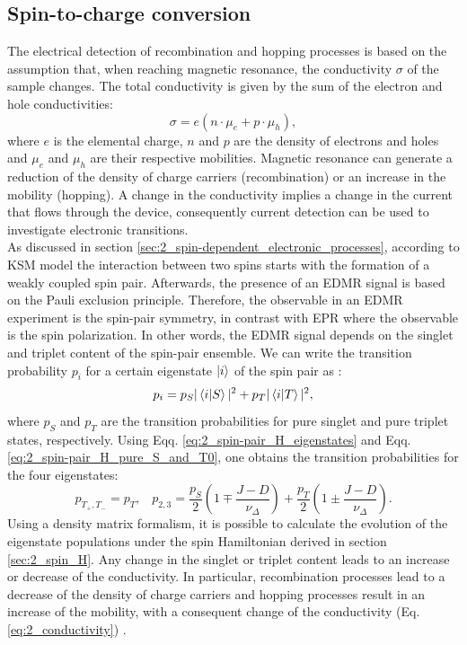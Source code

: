 \documentclass[a4paper]{book}
\newcommand{\sss}{\;\;\;} %
\begin{document}
	\subsection{Spin-to-charge conversion}
	\label{sec:2_spin-charge_conversion}
	The electrical detection of recombination and hopping processes is based on the assumption that, when reaching magnetic resonance, the conductivity $\sigma$ of the sample changes. The total conductivity is given by the sum of the electron and hole conductivities:
	\begin{equation}
		\sigma = e(n\cdot \mu_e + p\cdot \mu_h),
		\label{eq:2_conductivity}
	\end{equation}
	where $e$ is the elemental charge, $n$ and $p$ are the density of electrons and holes and $\mu_e$ and $\mu_h$ are their respective mobilities. Magnetic resonance can generate a reduction of the density of charge carriers (recombination) or an increase in the mobility (hopping). A change in the conductivity implies a change in the current that flows through the device, consequently current detection can be used to investigate electronic transitions.\\
	As discussed in section \ref{sec:2_spin-dependent_electronic_processes}, according to KSM model the interaction between two spins starts with the formation of a weakly coupled spin pair. Afterwards, the presence of an EDMR signal is based on the Pauli exclusion principle. Therefore, the observable in an EDMR experiment is the spin-pair symmetry, in contrast with EPR where the observable is the spin polarization. In other words, the EDMR signal depends on the singlet and triplet content of the spin-pair ensemble. We can write the transition probability $p_i$ for a certain eigenstate $\ket{i}$ of the spin pair as \cite{boehmeInvestigationChargeCarrier2006}:
	\begin{equation}
		\label{eq:2_transition_probability}
		p_i =
		p_S|\braket{i|S}|^2 + p_T|\braket{i|T}|^2,
	\end{equation}
	where $p_S$ and $p_T$ are the transition probabilities for pure singlet and pure triplet states, respectively. Using Eqq. \eqref{eq:2_spin-pair_H_eigenstates} and Eqq. \eqref{eq:2_spin-pair_H_pure_S_and_T0}, one obtains the transition probabilities for the four eigenstates:
	\begin{equation}
		p_{T_+,T_-} = p_T, \sss p_{2,3} = \frac{p_S}{2}\left(1 \mp \frac{J-D}{\nu_\Delta}\right) + \frac{p_T}{2}\left(1 \pm \frac{J-D}{\nu_\Delta}\right). 
	\end{equation}
	Using a density matrix formalism, it is possible to calculate the evolution of the eigenstate populations under the spin Hamiltonian derived in section \ref{sec:2_spin_H}. Any change in the singlet or triplet content leads to an increase or decrease of the conductivity. In particular, recombination processes lead to a decrease of the density of charge carriers and hopping processes result in an increase of the mobility, with a consequent change of the conductivity (Eq. \eqref{eq:2_conductivity}) \cite{boehmeInvestigationChargeCarrier2006}\cite{boehmeInvestigationElectronicTransitions2004}. 
	
\end{document}
